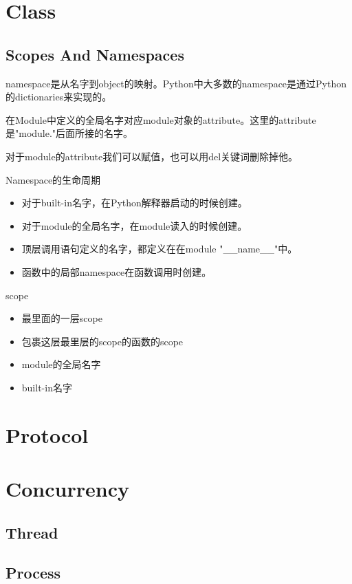 \section{Class}
\subsection{Scopes And Namespaces}
namespace是从名字到object的映射。Python中大多数的namespace是通过Python的dictionaries来实现的。

在Module中定义的全局名字对应module对象的attribute。这里的attribute是"module."后面所接的名字。

对于module的attribute我们可以赋值，也可以用del关键词删除掉他。

Namespace的生命周期
\begin{itemize}
\item 对于built-in名字，在Python解释器启动的时候创建。
\item 对于module的全局名字，在module读入的时候创建。
\item 顶层调用语句定义的名字，都定义在在module "\_\_name\_\_"中。
\item 函数中的局部namespace在函数调用时创建。
\end{itemize}

scope
\begin{itemize}
\item 最里面的一层scope
\item 包裹这层最里层的scope的函数的scope
\item module的全局名字
\item built-in名字
\end{itemize}

\section{Protocol}

\section{Concurrency}
\subsection{Thread}

\subsection{Process}

